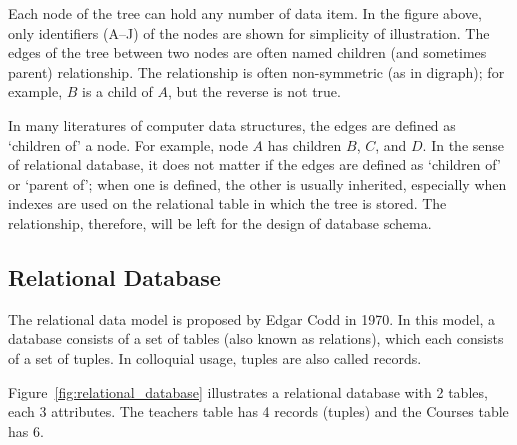 Each node of the tree can hold any number of data item. In the figure above, only identifiers (A--J) of the nodes are shown for simplicity of illustration. The edges of the tree between two nodes are often named children (and sometimes parent) relationship. The relationship is often non-symmetric (as in digraph); for example, $B$ is a child of $A$, but the reverse is not true.

In many literatures of computer data structures, the edges are defined as `children of' a node. For example, node $A$ has children $B$, $C$, and $D$. In the sense of relational database, it does not matter if the edges are defined as `children of' or `parent of'; when one is defined, the other is usually inherited, especially when indexes are used on the relational table in which the tree is stored. The relationship, therefore, will be left for the design of database schema.

\subsection{Relational Database}

The relational data model is proposed by Edgar Codd in 1970\cite{DBLP:journals/cacm/Codd70}. In this model, a database consists of a set of tables (also known as relations), which each consists of a set of tuples. In colloquial usage, tuples are also called records.

Figure~\ref{fig:relational_database} illustrates a relational database with 2 tables, each 3 attributes. The teachers table has 4 records (tuples) and the Courses table has 6.

\begin{table}[!h]
\centering
\caption{A Relational Database\label{fig:relational_database}}
\end{table}

